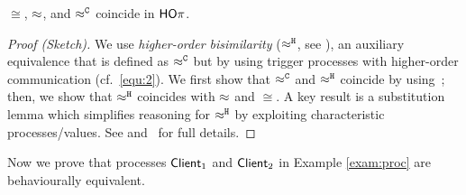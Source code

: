 \documentclass[a4paper,UKenglish]{lipics}
\theoremstyle{definition}
\begin{document}

\begin{theorem}[Coincidence]\rm
	\label{the:coincidence}
$\cong$, $\approx$,  and $\approx^\mathtt{C}$ coincide in $\mathsf{HO}\pi$. 
\vspace{-1mm}
\end{theorem}
\begin{proof}[Proof (Sketch)]
We use 
\emph{higher-order bisimilarity} ($\approx^\mathtt{H}$, see ), 
an auxiliary equivalence that
is defined as $\approx^\mathtt{C}$ but by
using  trigger processes with higher-order communication (cf.~\eqref{equ:2}).
We first show that $\approx^\mathtt{C}$ and $\approx^\mathtt{H}$ coincide by using~; 
then, we show that $\approx^\mathtt{H}$ coincides with $\approx$ and $\cong$. 
A key result is a  substitution lemma which simplifies reasoning 
for $\approx^\mathtt{H}$
by exploiting characteristic processes/values.
See
and~\cite{KouzapasPY15} for full details.
\end{proof}
Now we prove 
that  processes 
$\mathsf{Client}_1$ and $\mathsf{Client}_2$ 
in Example \ref{exam:proc}
are behaviourally equivalent.
\end{document}
